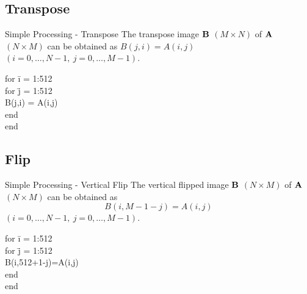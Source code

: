 \subsection{Transpose}
%
%
\begin{slide}{Simple Processing - Transpose}
\scriptsize
The transpose image ${\bf B}$ $(M\times N)$ of ${\bf A}$ $(N\times M)$
can be obtained
as $B(j,i)=A(i,j)$\\ $(i=0,\ldots,N-1,\ j=0,\ldots,M-1)$.

\begin{code}[8]{}
\begin{tabbing}
for \= i = 1:512 \\
\>	for \= j = 1:512 \\
\> \>	B(j,i) = A(i,j) \\
\> end \\
end
\end{tabbing}
\end{code}
\end{slide}

\subsection{Flip}

%
%
\begin{slide}{Simple Processing - Vertical Flip}
\scriptsize
The vertical flipped image ${\bf B}$ $(N\times M)$ of ${\bf A}$ $(N\times M)$
can be obtained
as $$B(i,M-1-j)=A(i,j)$$ $(i=0,\ldots,N-1,\ j=0,\ldots,M-1)$.


\begin{code}[8]{}
\begin{tabbing}
for \= i = 1:512 \\
\>	for \= j = 1:512 \\
\> \>   B(i,512+1-j)=A(i,j) \\
\> end \\
end \\
\end{tabbing}
\end{code}

\end{slide}

